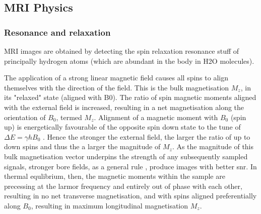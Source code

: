 \subsection{MRI Physics}

\subsubsection{Resonance and relaxation}


MRI images are obtained by detecting the spin relaxation resonance stuff of principally hydrogen atoms (which are abundant in the body in H2O molecules).

The application of a strong linear magnetic field causes all spins to align themselves with the direction of the field. This is the bulk magnetisation $M_z$, in its "relaxed" state (aligned with B0).
The ratio of spin magnetic moments aligned with the external field is increased,  resulting in a net magnetisation along the orientation of $B_0$, termed $M_z$.
Alignment of a magnetic moment with $B_0$ (spin up) is energetically favourable of the opposite spin down state to the tune of $\Delta E = \gamma h B_0$ .
Hence the stronger the external field, the larger the ratio of up to down spins and thus the a larger the magnitude of $M_z$.
As the magnitude of this bulk magnetisation vector underpins the strength of any subsequently sampled signals, stronger bore fields, as a general rule , produce images with better \gls{snr}.
In thermal equlibrium, then, the magnetic moments within the sample are precessing at the larmor frequency and entirely out of phase with each other, resulting in no net transverse magnetisation, and with spins aligned preferentially along $B_0$, resulting in maximum longitudinal magnetisation $M_z$.

